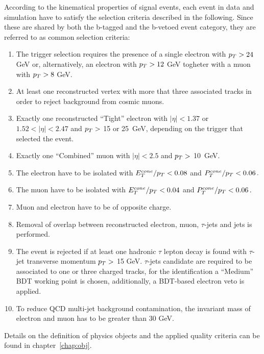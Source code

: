According to the kinematical properties of signal events, each event in data and simulation have to satisfy
the selection criteria described in the following. Since these are shared by both the b-tagged and the b-vetoed event category,
they are referred to as common selection criteria:


\begin{enumerate}[label=(\roman*)]
\item The trigger selection requires the presence of a single electron with $p_{T} > 24$ GeV or, alternatively,
	an electron with  $p_{T} > 12$ GeV togheter with a muon with  $p_{T} > 8$ GeV. 

\item At least one reconstructed vertex with more that three associated tracks in order to 
	reject background from cosmic muons.

\item Exactly one reconstructed ``Tight'' electron with $|\eta| < 1.37 $ or $1.52 < |\eta| < 2.47$ and
	 $p_{T} > $ 15 or 25~GeV, depending on the trigger that selected the event. 

\item Exactly one ``Combined'' muon with $|\eta| < 2.5$ and  $p_{T} > $ 10~GeV.

\item The electron have to be isolated with $E_T^{cone}/ p_{T} < 0.08$ and $P_T^{cone}/ p_{T} < 0.06\,.$ 

\item The muon have to be isolated with  $E_T^{cone}/ p_{T} < 0.04$ and $P_T^{cone}/ p_{T} <  0.06\,.$ 

\item Muon and electron have to be of opposite charge.

\item Removal of overlap between reconstructed electron, muon, $\tau$-jets and jets is performed.

\item The event is rejected if at least one hadronic $\tau$ lepton decay is found with  $\tau$-jet transverse 
	momentum  $p_{T} > $ 15 GeV. $\tau$-jets candidate are required to be associated to one or three charged tracks,
	for the identification a ``Medium'' BDT working point is chosen, additionally, a BDT-based electron veto is 
	applied. 

\item To reduce QCD multi-jet background contamination, the invariant mass of electron and muon has to be 
	greater than 30 GeV.

\end{enumerate}
Details on  the definition of physics objects and the applied quality criteria  can be found in  chapter~\ref{chap:obj}.

